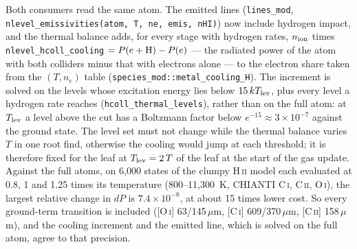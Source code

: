 \documentclass[english,a4paper]{my_memo}
\newcommand{\code}[1]{\texttt{#1}}
\begin{document}
Both consumers read the same atom.  The emitted lines
(\code{lines\_mod}, \code{nlevel\_emissivities(atom, T, ne, emis, nHI)})
now include hydrogen impact, and the thermal balance adds, for every stage
with hydrogen rates, $n_{\rm ion}$ times
\code{nlevel\_hcoll\_cooling} $= P(e + {\rm H}) - P(e)$ --- the radiated
power of the atom with both colliders minus that with electrons alone ---
to the electron share taken from the $(T, n_e)$ table
(\code{species\_mod::metal\_cooling\_H}).  The increment is solved on the
levels whose excitation energy lies below $15\,kT_{\rm lev}$, plus every
level a hydrogen rate reaches (\code{hcoll\_thermal\_levels}), rather than
on the full atom: at $T_{\rm lev}$ a level above the cut has a Boltzmann
factor below $e^{-15}\approx 3{\times}10^{-7}$ against the ground state.
The level set must not change while the thermal balance varies $T$ in one
root find, otherwise the cooling would jump at each threshold; it is
therefore fixed for the leaf at $T_{\rm lev} = 2\,T$ of the leaf at the
start of the gas update.  Against the full atoms, on 6,000 states of the
clumpy H\,\textsc{ii} model each evaluated at 0.8, 1 and 1.25 times its
temperature (800--11{,}300~K, CHIANTI C\,\textsc{i}, C\,\textsc{ii},
O\,\textsc{i}), the largest relative change in $dP$ is
$7.4{\times}10^{-8}$, at about 15 times lower cost.  So every ground-term
transition is included ([O\,\textsc{i}] 63/145\,$\mu$m, [C\,\textsc{i}]
609/370\,$\mu$m, [C\,\textsc{ii}] 158\,$\mu$m), and the cooling increment
and the emitted line, which is solved on the full atom, agree to that
precision.
\end{document}
